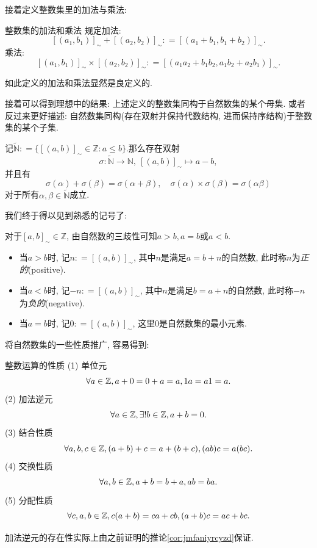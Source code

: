接着定义整数集里的加法与乘法: 

\begin{definition}{整数集的加法和乘法}
	规定加法: $$[(a_1, b_1)]_{\sim} + [(a_2, b_2)]_{\sim} : = [(a_1+b_1, b_1+b_2)]_{\sim}.$$
	乘法: 
	$$[(a_1, b_1)]_{\sim} \times [(a_2, b_2)]_{\sim} : = [(a_1a_2+b_1b_2, a_1b_2+a_2b_1)]_{\sim}.$$
\end{definition}

如此定义的加法和乘法显然是良定义的. 

接着可以得到理想中的结果: 上述定义的整数集同构于自然数集的某个母集. 或者反过来更好描述: 自然数集同构(存在双射并保持代数结构, 进而保持序结构)于整数集的某个子集. 

\begin{proposition}{}
	记$\tilde{\mathbb{N}}: =\{ [(a, b)]_{\sim} \in \mathbb{Z}: a \leq b \}$.那么存在双射$$\sigma : \tilde{\mathbb{N}} \to \mathbb{N}, ~[(a, b)]_{\sim} \mapsto a-b, $$
	并且有$$\sigma (\alpha) + \sigma (\beta) = \sigma (\alpha + \beta), \quad \sigma (\alpha) \times \sigma (\beta) = \sigma (\alpha  \beta)$$
	对于所有$\alpha , \beta \in \tilde{\mathbb{N}}$成立.
\end{proposition}

我们终于得以见到熟悉的记号了: 

\begin{definition}{}
	对于$[a, b]_{\sim} \in \mathbb{Z}$, 由自然数的三歧性可知$a>b, a=b$或$a<b$. 
	\begin{itemize}
		\item 当$a>b$时, 记$n: =[(a, b)]_{\sim}$, 其中$n$是满足$a=b+n$的自然数, 此时称$n$为\textit{正的}(positive). 
		\item 当$a<b$时, 记$-n: =[(a, b)]_{\sim}$, 其中$n$是满足$b=a+n$的自然数, 此时称$-n$为\textit{负的}(negative). 
		\item 当$a=b$时, 记$0: =[(a, b)]_{\sim}$, 这里$0$是自然数集的最小元素.
	\end{itemize}
\end{definition}

将自然数集的一些性质推广, 容易得到: 

\begin{proposition}{整数运算的性质}
	(1) 单位元$$\forall a \in \mathbb{Z} ,  a + 0 = 0+ a = a ,  1 a = a 1 = a .$$
	(2) 加法逆元$$\forall a \in \mathbb{Z} ,  \exists ! b \in \mathbb{Z} ,  a + b = 0 .$$
	(3) 结合性质$$\forall a ,  b ,  c \in \mathbb{Z} ,  (a + b) + c = a + (b + c) ,  (a b) c = a (b c) .$$
	(4) 交换性质$$\forall a ,  b \in \mathbb{Z} ,  a + b = b + a ,  a b = b a .$$
	(5) 分配性质$$\forall c ,  a ,  b \in \mathbb{Z} ,  c (a + b) = c a + c b, (a+b)c=ac+bc .$$
\end{proposition}
\begin{remark}
	加法逆元的存在性实际上由之前证明的推论\ref{cor:jmfaniyrcyzd}保证. 
\end{remark}


